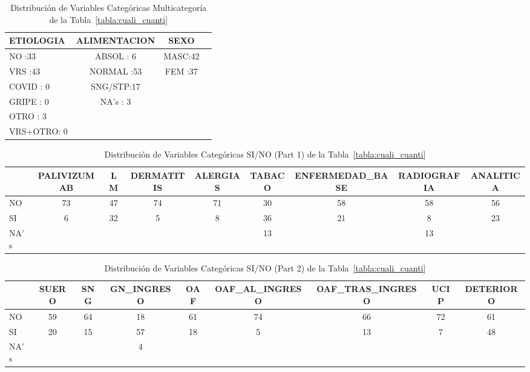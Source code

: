 \newpage
\thispagestyle{empty}
\begin{landscape}
\begin{table}[h]
    \centering
    \begin{tabular}{lccc}
    \hline
    ETIOLOGIA & ALIMENTACION & SEXO \\
    \hline
    NO      :33   & ABSOL  : 6    & MASC:42 \\
    VRS     :43   & NORMAL :53    & FEM :37 \\
    COVID   : 0   & SNG/STP:17    & \\
    GRIPE   : 0   & NA's   : 3    & \\
    OTRO    : 3   &                & \\
    VRS+OTRO: 0   &                & \\
    \hline
    \end{tabular}
    \caption{Distribución de Variables Categóricas Multicategoría de la Tabla~\ref{tabla:cuali_cuanti}}
    \label{tabla:distribucion_variables_categoricas_multicat}
\end{table}

\begin{table}[h]
    \centering
    \begin{tabular}{lcccccccc}
    \hline
        ~ & PALIVIZUMAB & LM & DERMATITIS & ALERGIAS & TABACO & ENFERMEDAD\_BASE & RADIOGRAFIA & ANALITICA \\
        \hline
        NO & 73 & 47 & 74 & 71 & 30 & 58 & 58 & 56 \\
        SI & 6 & 32 & 5 & 8 & 36 & 21 & 8 & 23 \\
        NA's & ~ & ~ & ~ & ~ & 13 & ~ & 13 & ~ \\
        \hline
    \end{tabular}
    \caption{Distribución de Variables Categóricas SI/NO (Part 1) de la Tabla~\ref{tabla:cuali_cuanti}}
    \label{tabla:distribucion_variables_categoricas_si_no_1}
\end{table}

\begin{table}[h]
    \centering
    \begin{tabular}{lcccccccc}
    \hline
        ~ & SUERO & SNG & GN\_INGRESO & OAF & OAF\_AL\_INGRESO & OAF\_TRAS\_INGRESO & UCIP & DETERIORO \\
        \hline
        NO & 59 & 64 & 18 & 61 & 74 & 66 & 72 & 61 \\
        SI & 20 & 15 & 57 & 18 & 5 & 13 & 7 & 48 \\
        NA's & ~ & ~ & 4 & ~ & ~ & ~ & ~ & ~ \\
        \hline
    \end{tabular}
    \caption{Distribución de Variables Categóricas SI/NO (Part 2) de la Tabla~\ref{tabla:cuali_cuanti}}
    \label{tabla:distribucion_variables_categoricas_si_no_2}
\end{table}


\end{landscape}
